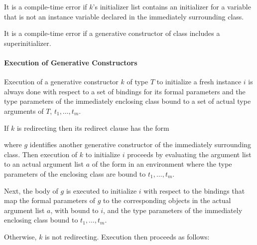 \documentclass[makeidx]{article}
\begin{document}
\LMHash{}%
It is a compile-time error if $k$'s initializer list contains an initializer for a variable that is not an instance variable declared in the immediately surrounding class.


\LMHash{}%
It is a compile-time error if a generative constructor of class  includes a superinitializer.


\paragraph{Execution of Generative Constructors}

\LMHash{}%
Execution of a generative constructor $k$ of type $T$ to initialize a fresh instance $i$
is always done with respect to a set of bindings for its formal parameters
and the type parameters of the immediately enclosing class bound to
a set of actual type arguments of $T$, $t_1, \ldots, t_m$.


\LMHash{}%
If $k$ is redirecting then its redirect clause has the form


where $g$ identifies another  generative constructor of the immediately surrounding class.
Then execution of $k$ to initialize $i$ proceeds by evaluating the argument list
to an actual argument list $a$ of the form
in an environment where the type parameters of the enclosing class are bound to
$t_1, \ldots, t_m$.

\LMHash{}%
Next, the body of $g$ is executed to initialize $i$ with respect to the bindings that map
the formal parameters of $g$ to the corresponding objects in the actual argument list $a$,
with \THIS{} bound to $i$,
and the type parameters of the immediately enclosing class bound to $t_1, \ldots, t_m$.

\LMHash{}%
Otherwise, $k$ is not redirecting.
Execution then proceeds as follows:
\end{document}

